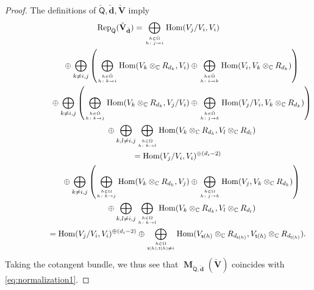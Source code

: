 \documentclass[pdftex]{sigma}
\numberwithin{equation}{section}
\theoremstyle{definition}
\newcommand{\C}{\mathbb{C}} %
\newcommand{\Hom}{\operatorname{Hom}}
\newcommand{\Rep}{\operatorname{Rep}}
\newcommand{\bM}{\operatorname{\mathbf{M}}}
\newcommand{\bV}{\mathbf{V}}
\newcommand{\ved}{\mathbf{d}}
\newcommand{\sumfrac}[2]{\genfrac{}{}{0pt}{2}{#1}{#2}}
\newcommand{\vin}{\mathsf{t}} %
\newcommand{\vout}{\mathsf{s}} %
\newcommand{\QQ}{\mathsf{Q}} %
\begin{document}
\begin{proof}
The def\/initions of $\check{\QQ},\check{\ved}, \check{\bV}$ imply
\begin{gather*}
\Rep_{\check{\QQ}}(\check{\bV}_{\check{\ved}}) =
\bigoplus_{\sumfrac{h \in \check{\Omega}}{h\colon j \to i}}
\Hom(V_j/V_i,V_i)
\\
\phantom{\Rep_{\check{\QQ}}(\check{\bV}_{\check{\ved}}) =}{}   \oplus \bigoplus_{k\neq i,j}\left(
\bigoplus_{\sumfrac{h \in \check{\Omega}}{h\colon k\to i}}
\Hom(V_k \otimes_\C R_{d_k},V_i)
\oplus
\bigoplus_{\sumfrac{h \in \check{\Omega}}{h\colon i\to k}}
\Hom(V_i,V_k \otimes_\C R_{d_k}) \right)
\\
\phantom{\Rep_{\check{\QQ}}(\check{\bV}_{\check{\ved}}) =}{} \oplus \bigoplus_{k\neq i,j}\left(
\bigoplus_{\sumfrac{h \in \check{\Omega}}{h\colon k\to j}}
\Hom(V_k \otimes_\C R_{d_k},V_j/V_i)
\oplus
\bigoplus_{\sumfrac{h \in \check{\Omega}}{h\colon j\to k}}
\Hom(V_j/V_i,V_k \otimes_\C R_{d_k}) \right)
\\
\phantom{\Rep_{\check{\QQ}}(\check{\bV}_{\check{\ved}}) =}{} \oplus \bigoplus_{k,l\neq i,j}
\bigoplus_{\sumfrac{h \in \check{\Omega}}{h\colon k\to l}}
\Hom(V_k \otimes_\C R_{d_k},V_l \otimes_\C R_{d_l})
\\
\phantom{\Rep_{\check{\QQ}}(\check{\bV}_{\check{\ved}})}{} = \Hom(V_j/V_i,V_i)^{\oplus (d_i-2)}
\\
\phantom{\Rep_{\check{\QQ}}(\check{\bV}_{\check{\ved}}) =}{} \oplus \bigoplus_{k\neq i,j}\left(
\bigoplus_{\sumfrac{h \in \Omega}{h\colon k\to j}}
\Hom(V_k \otimes_\C R_{d_k},V_j)
\oplus
\bigoplus_{\sumfrac{h \in \Omega}{h\colon j\to k}}
\Hom(V_j,V_k \otimes_\C R_{d_k}) \right)
\\
\phantom{\Rep_{\check{\QQ}}(\check{\bV}_{\check{\ved}}) =}{} \oplus \bigoplus_{k,l\neq i,j}
\bigoplus_{\sumfrac{h \in \Omega}{h\colon k\to l}}
\Hom(V_k \otimes_\C R_{d_k},V_l \otimes_\C R_{d_l})
\\
\phantom{\Rep_{\check{\QQ}}(\check{\bV}_{\check{\ved}})}{} = \Hom(V_j/V_i,V_i)^{\oplus (d_i-2)} \oplus
\bigoplus_{\sumfrac{h \in \Omega}{\vout(h),\vin(h)\neq i}}
\Hom(V_{\vout(h)} \otimes_\C R_{d_{\vout(h)}},
V_{\vin(h)} \otimes_\C R_{d_{\vin(h)}}).
\end{gather*}
Taking the cotangent bundle,
we thus see that
$\bM_{\check{\QQ},\check{\ved}}(\check{\bV})$
coincides with \eqref{eq:normalization1}.
\end{proof}
\end{document}
